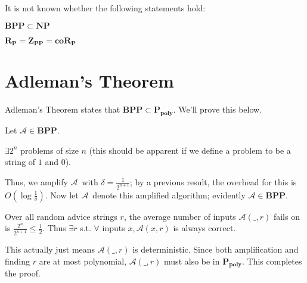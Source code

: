 \documentclass[11pt]{article}
\newcommand{\NP}{\ensuremath{\mathbf{NP}}}
\newcommand{\BPP}{\ensuremath{\mathbf{BPP}}}
\newcommand{\ZPP}{\ensuremath{\mathbf{Z_{PP}}}}
\newcommand{\RP}{\ensuremath{\mathbf{R_{P}}}}
\newcommand{\coRP}{\ensuremath{\mathbf{coR_{P}}}}
\newcommand{\Ppoly}{\ensuremath{\mathbf{P_{poly}}}}
\newcommand{\Alg}{\ensuremath{\mathcal{A}}}
\begin{document}
It is not known whether the following statements hold:

$\BPP\subset\NP$

$\RP=\ZPP=\coRP$

\section{Adleman's Theorem}

Adleman's Theorem states that $\BPP\subset\Ppoly$. We'll prove this below.

Let $\Alg\in\BPP$.

$\exists 2^n$ problems of size $n$ (this should be apparent if we define a problem to be a string of $1$ and $0$).

Thus, we amplify \Alg\ with $\delta = \frac{1}{2^{n+1}}$; by a previous result, the overhead for this is $O(\log{\frac{1}{\delta}})$. Now let \Alg\ denote this amplified algorithm; evidently $\Alg\in\BPP$.

Over all random advice strings $r$, the average number of inputs $\Alg(\_, r)$ fails on is $\frac{2^n}{2^{n+1}} \leq \frac{1}{2}$. Thus $\exists r$ s.t. $\forall$ inputs $x, \Alg(x, r)$ is always correct.

This actually just means $\Alg(\_, r)$ is deterministic. Since both amplification and finding $r$ are at most polynomial, $\Alg(\_, r)$ must also be in \Ppoly. This completes the proof.




\begin{thebibliography}{42}



\end{thebibliography}
\end{document}
